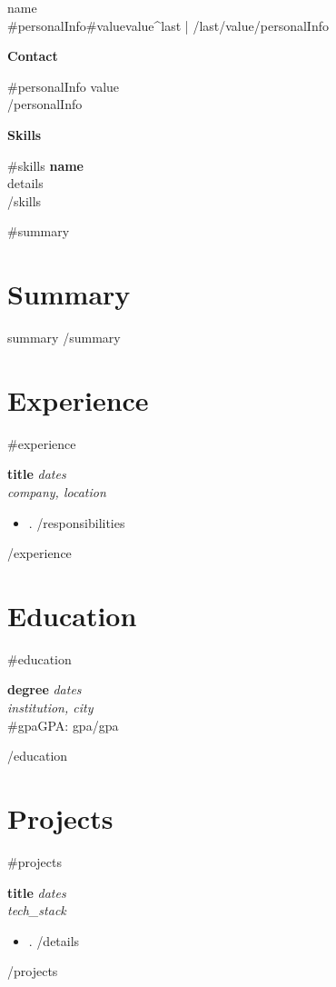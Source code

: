 \documentclass[a4paper,11pt]{article}
\newcommand{\header}[2]{
  \begin{center}
    {\Huge\color{mainblue}#1}\\[0.5em]
    {\large\color{gray}#2}
  \end{center}
}
\newcommand{\sidebarSection}[1]{
  \vspace{1em}
  {\color{mainblue}\large\textbf{#1}}
  \vspace{0.5em}
}
\newcommand{\bodySection}[1]{
  \section{#1}
}
\newcommand{\entry}[4]{
  \textbf{#1} \hfill \textit{#2}\\
  \textit{#3}\\
  #4
}
\begin{document}
\header{ {{name}} }{ {{#personalInfo}}{{#value}}{{value}}{{^last}} | {{/last}}{{/value}}{{/personalInfo}} }

\vspace{1em}

\begin{multicols}{2}

\begin{minipage}[t]{0.3\textwidth}
  \color{gray}

  \sidebarSection{Contact}
  {{#personalInfo}}
   {{value}}\\
  {{/personalInfo}}

  \sidebarSection{Skills}
  {{#skills}}
  \textbf{ {{name}} }\\
  {{details}}\\
  {{/skills}}

\end{minipage}

\columnbreak

\begin{minipage}[t]{0.7\textwidth}

  {{#summary}}
  \bodySection{Summary}
  {{summary}}
  {{/summary}}

  \bodySection{Experience}
  {{#experience}}
  \entry{ {{title}} }{ {{dates}} }{ {{company}}, {{location}} }{
    \begin{itemize}
      {{#responsibilities}}
      \item {{.}}
      {{/responsibilities}}
    \end{itemize}
  }
  {{/experience}}

  \bodySection{Education}
  {{#education}}
  \entry{ {{degree}} }{ {{dates}} }{ {{institution}}, {{city}} }{
    {{#gpa}}GPA: {{gpa}}{{/gpa}}
  }
  {{/education}}

  \bodySection{Projects}
  {{#projects}}
  \entry{ {{title}} }{ {{dates}} }{ {{tech_stack}} }{
    \begin{itemize}
      {{#details}}
      \item {{.}}
      {{/details}}
    \end{itemize}
  }
  {{/projects}}

\end{minipage}

\end{multicols}
\end{document}
